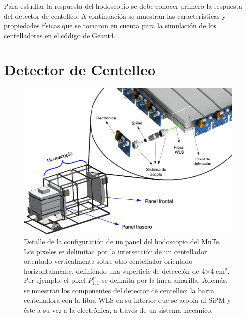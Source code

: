 \documentclass[12pt,oneside,openany,letter]{book}
\begin{document}
Para estudiar la respuesta del hodoscopio se debe conocer primero la respuesta del detector de centelleo. A continuaci\'on se muestran las características y propiedades físicas que se tomaron en cuenta para la simulación de los centelladores en el código de Geant4.



\section{Detector de Centelleo}
\begin{figure}[h!]
    \centering       
    \includegraphics[scale=0.5]{hodoscopio.png}
   \caption[Detalle de la configuración de un panel del hodoscopio del MuTe]{Detalle de la configuración de un panel del hodoscopio del MuTe. Los pixeles se delimitan por la intersecci\'on de un centellador orientado verticalmente sobre otro centellador orientado horizontalmente, definiendo una superficie de detecci\'on de 4$\times$4 cm$^{2}$. Por ejemplo, el pixel $P^{F}_{1,1}$ se delimita por la línea amarilla. Además, se muestran los componentes del detector de centelleo: la barra centelladora con la fibra WLS en su interior que se acopla al SiPM y éste a su vez a la electrónica, a través de un sistema mecánico.}\label{panel_desc}
\end{figure}
\end{document}
